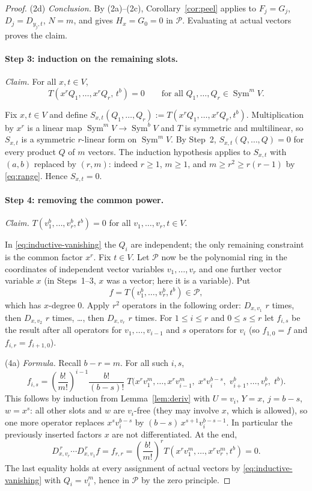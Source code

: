 \documentclass[11pt]{article}
\theoremstyle{remark}
\DeclareMathOperator{\Sym}{Sym}
\newcommand{\D}[2]{D_{#1,#2}}
\newcommand{\PP}{\mathcal P}
\begin{document}
\begin{proof}
(2d) \emph{Conclusion.} By (2a)--(2c), Corollary~\ref{cor:peel} applies to
$F_j=G_j$, $D_j=\D{y_j}{t}$, $N=m$, and gives $H_x=G_0=0$ in $\PP$.
Evaluating at actual vectors proves the claim.

\paragraph{Step 3: induction on the remaining slots.}
\emph{Claim.} For all $x,t\in V$,
\begin{equation}\label{eq:inductive-vanishing}
 T(x^rQ_1,\ldots,x^rQ_r,\,t^b)=0
 \qquad\text{for all }Q_1,\ldots,Q_r\in\Sym^m V.
\end{equation}

Fix $x,t\in V$ and define
$S_{x,t}(Q_1,\ldots,Q_r):=T(x^rQ_1,\ldots,x^rQ_r,t^b)$. Multiplication by
$x^r$ is a linear map $\Sym^mV\to\Sym^bV$ and $T$ is symmetric and
multilinear, so $S_{x,t}$ is a symmetric $r$-linear form on $\Sym^mV$. By
Step~2, $S_{x,t}(Q,\dots,Q)=0$ for every product $Q$ of $m$ vectors. The
induction hypothesis applies to $S_{x,t}$ with $(a,b)$ replaced by $(r,m)$:
indeed $r\ge1$, $m\ge1$, and $m\ge r^2\ge r(r-1)$ by \eqref{eq:range}.
Hence $S_{x,t}=0$.

\paragraph{Step 4: removing the common power.}
\emph{Claim.} $T(v_1^b,\ldots,v_r^b,t^b)=0$ for all
$v_1,\dots,v_r,t\in V$.

In \eqref{eq:inductive-vanishing} the $Q_i$ are independent; the only
remaining constraint is the common factor $x^r$. Fix $t\in V$. Let $\PP$
now be the polynomial ring in the coordinates of independent vector
variables $v_1,\ldots,v_r$ and one further vector variable $x$ (in
Steps~1--3, $x$ was a vector; here it is a variable). Put
\[
 f=T(v_1^b,\ldots,v_r^b,t^b)\in\PP ,
\]
which has $x$-degree $0$. Apply $r^2$ operators in the following order:
$\D{x}{v_1}$ $r$ times, then $\D{x}{v_2}$ $r$ times, \dots, then
$\D{x}{v_r}$ $r$ times. For $1\le i\le r$ and $0\le s\le r$ let $f_{i,s}$
be the result after all operators for $v_1,\dots,v_{i-1}$ and $s$ operators
for $v_i$ (so $f_{1,0}=f$ and $f_{i,r}=f_{i+1,0}$).

(4a) \emph{Formula.} Recall $b-r=m$. For all such $i,s$,
\[
 f_{i,s}=\left(\frac{b!}{m!}\right)^{i-1}\frac{b!}{(b-s)!}\;
 T\bigl(x^rv_1^m,\ldots,x^rv_{i-1}^m,\;x^sv_i^{b-s},\;
 v_{i+1}^b,\ldots,v_r^b,\;t^b\bigr).
\]
This follows by induction from Lemma~\ref{lem:deriv} with $U=v_i$, $Y=x$,
$j=b-s$, $w=x^s$: all other slots and $w$ are $v_i$-free (they may involve
$x$, which is allowed), so one more operator replaces $x^sv_i^{b-s}$ by
$(b-s)\,x^{s+1}v_i^{b-s-1}$. In particular the previously inserted factors
$x$ are not differentiated. At the end,
\begin{equation}\label{eq:second-composition}
 \D{x}{v_r}^{\,r}\cdots\D{x}{v_1}^{\,r}f=f_{r,r}
 =\left(\frac{b!}{m!}\right)^r
 T(x^rv_1^m,\ldots,x^rv_r^m,t^b)=0.
\end{equation}
The last equality holds at every assignment of actual vectors by
\eqref{eq:inductive-vanishing} with $Q_i=v_i^m$, hence in $\PP$ by the zero
principle.


\end{proof}
\end{document}
